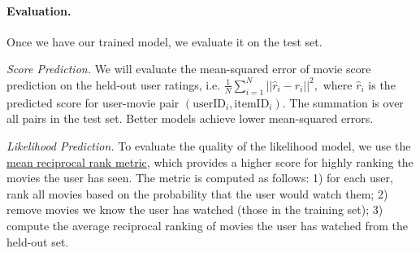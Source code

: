 \documentclass[12pt]{article}
\begin{document}
    \paragraph{Evaluation.}
    Once we have our trained model, we evaluate it on the test set.

    \vspace{0.2cm}
    \noindent \emph{Score Prediction.} We will evaluate the mean-squared error of movie score prediction on the held-out user ratings, i.e.
    $
    \frac{1}{N}\sum_{i=1}^N ||\hat{r}_i-r_i||^2,
    $
    where $\hat{r}_i$ is the predicted score for user-movie pair $(\text{userID}_i,\text{itemID}_i)$. The summation is over all pairs in the test set. Better models achieve lower mean-squared errors.

    \vspace{0.2cm}
    \noindent \emph{Likelihood Prediction.}
    To evaluate the quality of the likelihood model, we use the \href{https://en.wikipedia.org/wiki/Mean_reciprocal_rank} {mean reciprocal rank metric}, which provides a higher score for highly ranking the movies the user has seen. The metric is computed as follows: 1) for each user, rank all movies based on the probability that the user would watch them; 2) remove movies we know the user has watched (those in the training set); 3) compute the average reciprocal ranking of movies the user has watched from the held-out set.

\end{document}
